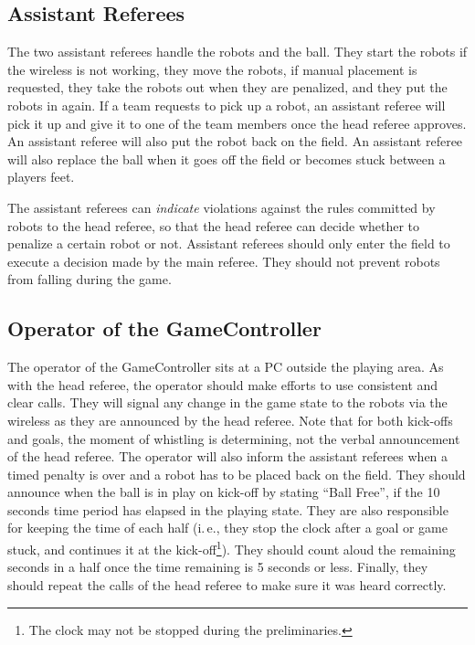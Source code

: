 \documentclass[12pt]{article}
\newcommand{\ie}{\mbox{i.\,e.}\xspace}
\newcommand{\KickOffBallFreeTime}{10 seconds\xspace}
\begin{document}
\subsection{Assistant Referees}
\label{sec:assist_referee}
The two assistant referees handle the robots and the ball. They start the robots if the wireless is not working, they move the robots, if manual placement is requested, they take the robots out when they are penalized, and they put the robots in again. If a team requests to pick up a robot, an assistant referee will pick it up and give it to one of the team members once the head referee approves. An assistant referee will also put the robot back on the field. An assistant referee will also replace the ball when it goes off the field or becomes stuck between a players feet.

The assistant referees can \textit{indicate} violations against the rules committed by robots to the head referee, so that the head referee can decide whether to penalize a certain robot or not. Assistant referees should only enter the field to execute a decision made by the main referee. They should not prevent robots from falling during the game.

\subsection{Operator of the GameController}
\label{sec:gameControllerOp}
The operator of the GameController sits at a PC outside the playing area.
As with the head referee, the operator should make efforts to use consistent and clear calls.
They will signal any change in the game state to the robots via the wireless as they are announced by the head referee.
Note that for both kick-offs and goals, the moment of whistling is determining, not the verbal announcement of the head referee.
The operator will also inform the assistant referees when a timed penalty is over and a robot has to be placed back on the field.
They should announce when the ball is in play on kick-off by stating ``Ball Free'', if the \KickOffBallFreeTime time period has elapsed in the playing state.
They are also responsible for keeping the time of each half (\ie, they stop the clock after a goal or game stuck, and continues it at the kick-off\footnote{The clock may not be stopped during the preliminaries.}).
They should count aloud the remaining seconds in a half once the time remaining is 5 seconds or less.
Finally, they should repeat the calls of the head referee to make sure it was heard correctly.
\end{document}
